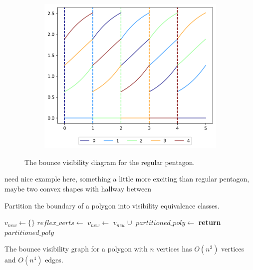 \documentclass[]{styles/svproc}  %
\begin{document}
\begin{figure}
\begin{subfigure}{0.35\textwidth}
\includegraphics[width=\linewidth]{figures/regular_pent_bvd.png}
\end{subfigure}
\caption{The bounce visibility diagram for the regular pentagon. }
\label{fig:regular_pent_bvd}
\end{figure}

{\color{red} need nice example here, something a little more exciting than
regular pentagon, maybe two convex shapes with hallway between}


\begin{algorithm}
\caption{Partition the boundary of a polygon into visibility
equivalence classes.}
\label{algo:insert}
\begin{algorithmic}
\State $v_{new} \gets \{\}$
\State $reflex\_verts \gets$ 
 
        \State $v_{new} \gets$ $v_{new} \cup$ 
    \EndFor
\EndFor
\State $partitioned\_poly \gets$ 
\State \textbf{return} $partitioned\_poly$
\EndProcedure
\end{algorithmic}
\end{algorithm}

\begin{proposition} The bounce visibility graph for a polygon with $n$ vertices has 
$O(n^2)$ vertices and $O(n^4)$ edges.
\end{proposition}
\end{document}
